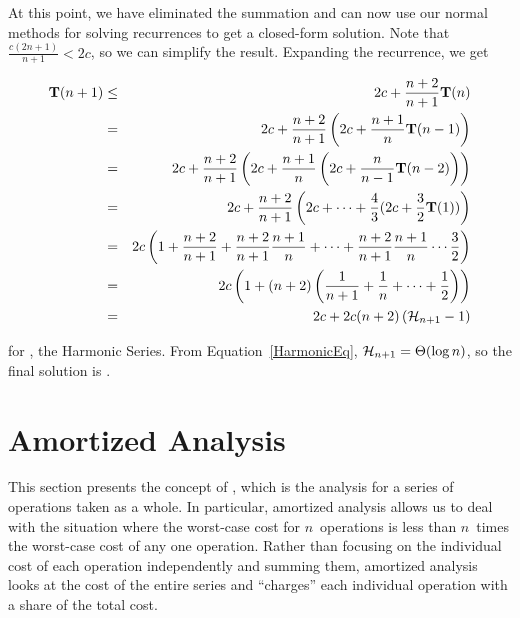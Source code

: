 \noindent At this point, we have eliminated the summation and can now
use our normal methods for solving recurrences to get a closed-form
solution.
Note that $\frac{c(2n+1)}{n+1} < 2c$, so we can simplify the result.
Expanding the recurrence, we get

\begin{eqnarray*}
{\bf T}(n+1) & \leq & 2c + \frac{n+2}{n+1} {\bf T}(n)\\
             & = & 2c + \frac{n+2}{n+1}\left (2c +
                        \frac{n+1}{n}{\bf T}(n-1)\right )\\
             & = & 2c + \frac{n+2}{n+1}\left (2c + \frac{n+1}{n}\left
                       (2c + \frac{n}{n-1}{\bf T}(n-2)\right )\right )\\
             & = & 2c + \frac{n+2}{n+1}\left (2c + \cdots +
                            \frac{4}{3}(2c + \frac{3}{2}{\bf T}(1))\right )\\
             & = & 2c\left (1 + \frac{n+2}{n+1}
                     + \frac{n+2}{n+1}\frac{n+1}{n} + \cdots
                     + \frac{n+2}{n+1}\frac{n+1}{n}\cdots\frac{3}{2}\right )\\
             & = & 2c\left (1 + (n+2)\left (\frac{1}{n+1}
                     + \frac{1}{n} + \cdots + \frac{1}{2}\right )\right )\\
             & = & 2c + 2c(n+2)\left (\mbox{${\cal H}_{n+1}$} - 1\right )\\
\end{eqnarray*}

\vspace{-\bigskipamount}
\noindent for \Harmonicnp, the Harmonic
Series.
From Equation~\ref{HarmonicEq}, \(\mbox{${\cal H}_{n+1}$} = \Theta(\log n)\),
so the final solution is \Thetanlogn.


\section{Amortized Analysis}
\label{AmortAnal}

This section presents the concept of ,
which is the analysis for a series of operations taken as a whole.
In particular, amortized analysis allows us to deal with the
situation where the worst-case cost for $n$~operations is less than
$n$~times the worst-case cost of any one operation.
Rather than focusing on the individual cost of each operation
independently and summing them, amortized analysis looks at the
cost of the entire series and ``charges'' each individual operation
with a share of the total cost.

